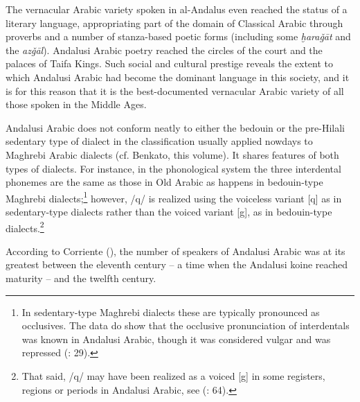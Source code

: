 \documentclass[output=paper,modfonts,nonflat]{langsci/langscibook}
\begin{document}
The vernacular Arabic variety spoken in al-Andalus even reached the status of a literary language, appropriating part of the domain of Classical Arabic through proverbs and a number of stanza-based poetic forms (including some \textit{ḫaraǧāt} and the \textit{azǧāl}). Andalusi Arabic poetry reached the circles of the court and the palaces of Taifa Kings. Such social and cultural prestige reveals the extent to which Andalusi Arabic had become the dominant language in this society, and it is for this reason that it is the best-documented vernacular Arabic variety of all those spoken in the Middle Ages. 

Andalusi Arabic does not conform neatly to either the bedouin or the pre-Hilali sedentary type of dialect in the classification usually applied nowdays to Maghrebi Arabic dialects (cf. Benkato, this volume). It shares features of both types of dialects. For instance, in the phonological system the three interdental phonemes are the same as those in Old Arabic as happens in bedouin-type Maghrebi dialects;\footnote{In sedentary-type Maghrebi dialects these are typically pronounced as occlusives. The data do show that the occlusive pronunciation of interdentals was known in Andalusi Arabic, though it was considered vulgar and was repressed (\citealt{CorrientePereiraVicente2015}: 29).}  however, /q/ is realized using the voiceless variant [q] as in sedentary-type dialects rather than the voiced variant [g], as in bedouin-type dialects.\footnote{That said, /q/ may have been realized as a voiced [g] in some registers, regions or periods in Andalusi Arabic, see (\citealt{CorrientePereiraVicente2015}: 64).}

According to Corriente (\citeyear[34]{Corriente1992book}), the number of speakers of Andalusi Arabic was at its greatest between the eleventh century – a time when the Andalusi koine reached maturity – and the twelfth century. 
\end{document}
